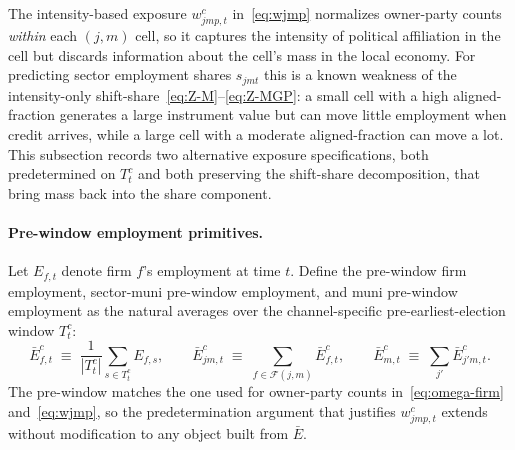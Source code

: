 \documentclass{article}
\newcommand{\cF}{\mathcal{F}}
\theoremstyle{plain}
\theoremstyle{definition}
\theoremstyle{remark}
\begin{document}
The intensity-based exposure $w^{c}_{jmp,t}$ in~\eqref{eq:wjmp}
normalizes owner-party counts \emph{within} each $(j,m)$ cell, so it
captures the intensity of political affiliation in the cell but discards
information about the cell's mass in the local economy. For predicting
sector employment shares $s_{jmt}$ this is a known weakness of the
intensity-only shift-share~\eqref{eq:Z-M}--\eqref{eq:Z-MGP}: a small cell
with a high aligned-fraction generates a large instrument value but can
move little employment when credit arrives, while a large cell with a
moderate aligned-fraction can move a lot. This subsection records two
alternative exposure specifications, both predetermined on
$T^{c}_{t}$ and both preserving the shift-share decomposition,
that bring mass back into the share component.

\paragraph{Pre-window employment primitives.}
Let $E_{f,t}$ denote firm $f$'s employment at time $t$. Define the
pre-window firm employment, sector-muni pre-window employment, and muni
pre-window employment as the natural averages over the channel-specific
pre-earliest-election window $T^{c}_t$:
\begin{equation}\label{eq:Ebar}
  \bar E^c_{f,t}\;\equiv\;
   \frac{1}{|T^{c}_t|}\sum_{s\in T^{c}_t} E_{f,s},
  \qquad
  \bar E^c_{jm,t}\;\equiv\;\sum_{f\in\cF(j,m)} \bar E^c_{f,t},
  \qquad
  \bar E^c_{m,t}\;\equiv\;\sum_{j'} \bar E^c_{j'm,t}.
\end{equation}
The pre-window matches the one used for owner-party counts
in~\eqref{eq:omega-firm} and~\eqref{eq:wjmp}, so the predetermination
argument that justifies $w^{c}_{jmp,t}$ extends without
modification to any object built from $\bar E$.
\end{document}
